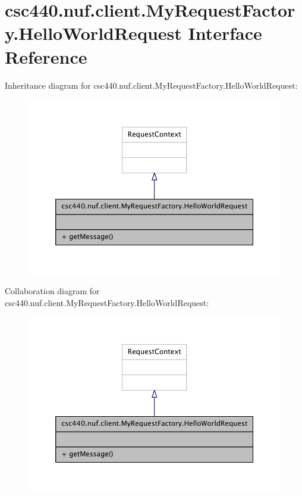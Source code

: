 \hypertarget{interfacecsc440_1_1nuf_1_1client_1_1_my_request_factory_1_1_hello_world_request}{\section{csc440.\-nuf.\-client.\-My\-Request\-Factory.\-Hello\-World\-Request Interface Reference}
\label{interfacecsc440_1_1nuf_1_1client_1_1_my_request_factory_1_1_hello_world_request}
}


Inheritance diagram for csc440.\-nuf.\-client.\-My\-Request\-Factory.\-Hello\-World\-Request\-:
\nopagebreak
\begin{figure}[H]
\begin{center}
\leavevmode
\includegraphics[width=350pt]{interfacecsc440_1_1nuf_1_1client_1_1_my_request_factory_1_1_hello_world_request__inherit__graph}
\end{center}
\end{figure}


Collaboration diagram for csc440.\-nuf.\-client.\-My\-Request\-Factory.\-Hello\-World\-Request\-:
\nopagebreak
\begin{figure}[H]
\begin{center}
\leavevmode
\includegraphics[width=350pt]{interfacecsc440_1_1nuf_1_1client_1_1_my_request_factory_1_1_hello_world_request__coll__graph}
\end{center}
\end{figure}
